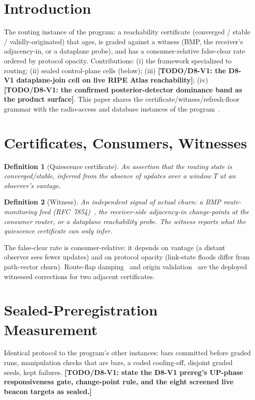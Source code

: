 \documentclass[lettersize,onecolumn]{IEEEtran}
\newcommand{\TODO}[1]{{\color{red}\textbf{[TODO/D8-V1: #1]}}}
\newtheorem{definition}{Definition}
\begin{document}
\section{Introduction}
The routing instance of the program: a reachability certificate (converged /
stable / validly-originated) that ages, is graded against a witness (BMP, the
receiver's adjacency-in, or a dataplane probe), and has a consumer-relative
false-clear rate ordered by protocol opacity. Contributions: (i) the framework
specialized to routing; (ii) sealed control-plane cells (below); (iii)
\TODO{the D8-V1 dataplane-join cell on live RIPE Atlas reachability}; (iv)
\TODO{the confirmed posterior-detector dominance band as the product surface}.
This paper shares the certificate/witness/refresh-floor grammar with the
radio-access and database instances of the program~\cite{bond_ot}.

\section{Certificates, Consumers, Witnesses}
\begin{definition}[Quiescence certificate]
An assertion that the routing state is converged/stable, inferred from the
absence of updates over a window $T$ at an observer's vantage.
\end{definition}
\begin{definition}[Witness]
An independent signal of actual churn: a BMP route-monitoring feed
(RFC~7854)~\cite{rfc7854}, the receiver-side adjacency-in change-points at the
consumer router, or a dataplane reachability probe. The witness reports what the
quiescence certificate can only infer.
\end{definition}
The false-clear rate is consumer-relative: it depends on vantage (a distant
observer sees fewer updates) and on protocol opacity (link-state floods differ
from path-vector churn). Route-flap damping~\cite{rfc2439} and origin
validation~\cite{rfc6811} are the deployed witnessed corrections for two adjacent
certificates.

\section{Sealed-Preregistration Measurement}
Identical protocol to the program's other instances: bars committed before graded
runs, manipulation checks that are bars, a coded cooling-off, disjoint graded
seeds, kept failures. \TODO{state the D8-V1 prereg's UP-phase responsiveness gate,
change-point rule, and the eight screened live beacon targets as sealed.}
\end{document}
